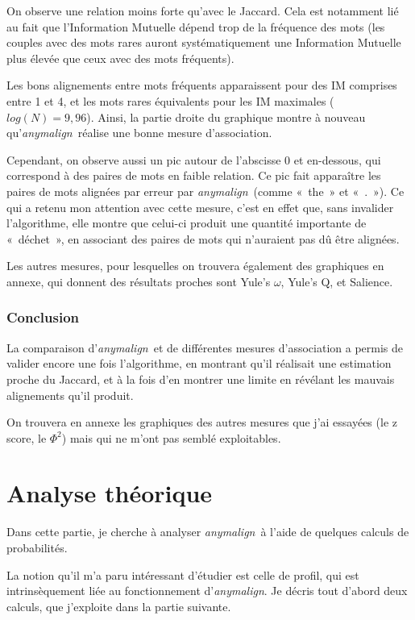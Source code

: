\documentclass[a4paper,10pt]{article}
\newcommand{\anym}{\emph{anymalign}}
\newcommand{\guill}[1]{«~#1~»}
\begin{document}
On observe une relation moins forte qu'avec le Jaccard. Cela est notamment lié au fait que l'Information Mutuelle dépend trop de la fréquence des mots (les couples avec des mots rares auront systématiquement une Information Mutuelle plus élevée que ceux avec des mots fréquents).

Les bons alignements entre mots fréquents apparaissent pour des IM comprises entre 1 et 4, et les mots rares équivalents pour les IM maximales ($log(N)=9,96$). Ainsi, la partie droite du graphique montre à nouveau qu'\anym~réalise une bonne mesure d'association.

Cependant, on observe aussi un pic autour de l'abscisse 0 et en-dessous, qui correspond à des paires de mots en faible relation. Ce pic fait apparaître les paires de mots alignées par erreur par \anym~(comme \guill{the} et \guill{.}). Ce qui a retenu mon attention avec cette mesure, c'est en effet que, sans invalider l'algorithme, elle montre que celui-ci produit une quantité importante de \guill{déchet}, en associant des paires de mots qui n'auraient pas dû être alignées.

Les autres mesures, pour lesquelles on trouvera également des graphiques en annexe, qui donnent des résultats proches sont Yule's $\omega$, Yule's Q, et Salience.

\subsubsection{Conclusion}

La comparaison d'\anym~et de différentes mesures d'association a permis de valider encore une fois l'algorithme, en montrant qu'il réalisait une estimation proche du Jaccard, et à la fois d'en montrer une limite en révélant les mauvais alignements qu'il produit.

On trouvera en annexe les graphiques des autres mesures que j'ai essayées (le z score, le $\Phi^2$) mais qui ne m'ont pas semblé exploitables.

\section{Analyse théorique}

Dans cette partie, je cherche à analyser \anym~à l'aide de quelques calculs de probabilités.

La notion qu'il m'a paru intéressant d'étudier est celle de profil, qui est intrinsèquement liée au fonctionnement d'\anym. Je décris tout d'abord deux calculs, que j'exploite dans la partie suivante.
\end{document}
